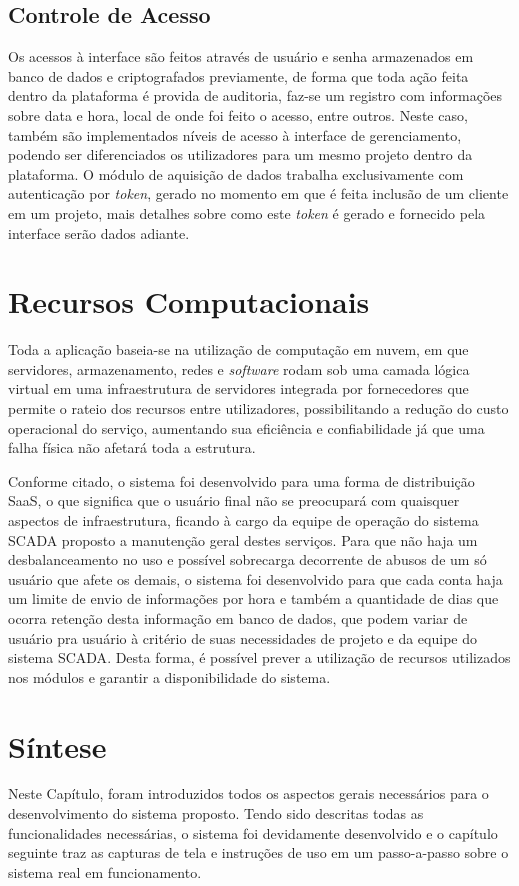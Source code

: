         \subsection{Controle de Acesso}
        \label{sec:controle-acesso}
        Os acessos à interface são feitos através de usuário e senha armazenados em banco de dados e criptografados previamente, de forma que toda ação feita dentro da plataforma é provida de auditoria, faz-se um registro com informações sobre data e hora, local de onde foi feito o acesso, entre outros. Neste caso, também são implementados níveis de acesso à interface de gerenciamento, podendo ser diferenciados os utilizadores para um mesmo projeto dentro da plataforma. O módulo de aquisição de dados trabalha exclusivamente com autenticação por \textit{token}, gerado no momento em que é feita inclusão de um cliente em um projeto, mais detalhes sobre como este \textit{token} é gerado e fornecido pela interface serão dados adiante.
        
\section{Recursos Computacionais}
\label{sec:recursos-computacionais }
    Toda a aplicação baseia-se na utilização de computação em nuvem, em que servidores, armazenamento, redes e \textit{software} rodam sob uma camada lógica virtual em uma infraestrutura de servidores integrada por fornecedores que permite o rateio dos recursos entre utilizadores, possibilitando a redução do custo operacional do serviço, aumentando sua eficiência e confiabilidade já que uma falha física não afetará toda a estrutura.
    
    Conforme citado, o sistema foi desenvolvido para uma forma de distribuição \gls{SaaS}, o que significa que o usuário final não se preocupará com quaisquer aspectos de infraestrutura, ficando à cargo da equipe de operação do sistema \gls{SCADA} proposto a manutenção geral destes serviços. Para que não haja um desbalanceamento no uso e possível sobrecarga decorrente de abusos de um só usuário que afete os demais, o sistema foi desenvolvido para que cada conta haja um limite de envio de informações por hora e também a quantidade de dias que ocorra retenção desta informação em banco de dados, que podem variar de usuário pra usuário à critério de suas necessidades de projeto e da equipe do sistema \gls{SCADA}. Desta forma, é possível prever a utilização de recursos utilizados nos módulos e garantir a disponibilidade do sistema.
    
\section{Síntese}
\label{sec:sintese-sistema}

Neste Capítulo, foram introduzidos todos os aspectos gerais necessários para o desenvolvimento do sistema proposto. Tendo sido descritas todas as funcionalidades necessárias, o sistema foi devidamente desenvolvido e o capítulo seguinte traz as capturas de tela e instruções de uso em um passo-a-passo sobre o sistema real em funcionamento.